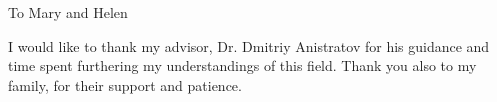 \begin{abstract}
	
\end{abstract}

\maketitlepage

\begin{dedication}
 \centering To Mary and Helen
\end{dedication}


\begin{acknowledgements}

	I would like to thank my advisor, Dr. Dmitriy Anistratov for his guidance and time spent furthering my understandings of this field. Thank you also to my family, for their support and patience.

\end{acknowledgements}


\thesistableofcontents

\thesislistoftables

\thesislistoffigures
